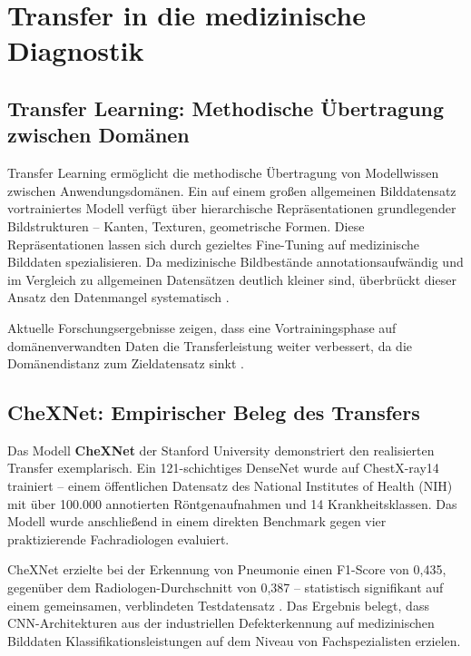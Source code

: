 \section{Transfer in die medizinische Diagnostik} \label{sec:transfer}

\subsection{Transfer Learning: Methodische Übertragung zwischen Domänen}
\label{sec:transfer_learning}

Transfer Learning ermöglicht die methodische Übertragung von Modellwissen zwischen
Anwendungsdomänen. Ein auf einem großen allgemeinen Bilddatensatz vortrainiertes Modell
verfügt über hierarchische Repräsentationen grundlegender Bildstrukturen -- Kanten,
Texturen, geometrische Formen. Diese Repräsentationen lassen sich durch gezieltes
Fine-Tuning auf medizinische Bilddaten spezialisieren. Da medizinische Bildbestände
annotationsaufwändig und im Vergleich zu allgemeinen Datensätzen deutlich kleiner sind,
überbrückt dieser Ansatz den Datenmangel systematisch \cite{transferMedical2024}.

Aktuelle Forschungsergebnisse zeigen, dass eine Vortrainingsphase auf domänenverwandten
Daten die Transferleistung weiter verbessert, da die Domänendistanz zum Zieldatensatz
sinkt \cite{aiMedicalImaging2025}.

\subsection{CheXNet: Empirischer Beleg des Transfers} \label{sec:chexnet}

Das Modell \textbf{CheXNet} der Stanford University demonstriert den realisierten Transfer
exemplarisch. Ein 121-schichtiges DenseNet wurde auf ChestX-ray14 trainiert -- einem
öffentlichen Datensatz des National Institutes of Health (NIH) mit über 100.000
annotierten Röntgenaufnahmen und 14 Krankheitsklassen. Das Modell wurde anschließend in
einem direkten Benchmark gegen vier praktizierende Fachradiologen evaluiert.

CheXNet erzielte bei der Erkennung von Pneumonie einen F1-Score von 0{,}435, gegenüber
dem Radiologen-Durchschnitt von 0{,}387 -- statistisch signifikant auf einem gemeinsamen,
verblindeten Testdatensatz \cite{chexnet2017}. Das Ergebnis belegt, dass CNN-Architekturen
aus der industriellen Defekterkennung auf medizinischen Bilddaten Klassifikationsleistungen
auf dem Niveau von Fachspezialisten erzielen.

